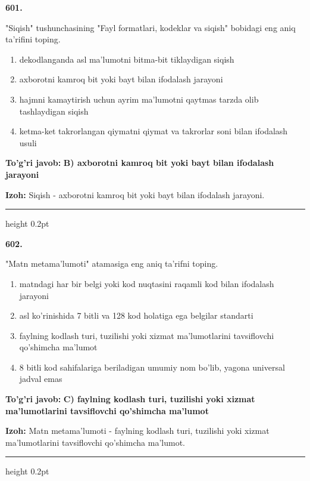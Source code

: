 \documentclass[10pt,a4paper,oneside]{article}
\begin{document}
\noindent\textbf{\color{ink}601.}
\par
"Siqish" tushunchasining "Fayl formatlari, kodeklar va siqish" bobidagi eng aniq ta'rifini toping.
\begin{enumerate}[label=\Alph*),leftmargin=9mm]
\item dekodlanganda asl ma'lumotni bitma-bit tiklaydigan siqish
\item axborotni kamroq bit yoki bayt bilan ifodalash jarayoni
\item hajmni kamaytirish uchun ayrim ma'lumotni qaytmas tarzda olib tashlaydigan siqish
\item ketma-ket takrorlangan qiymatni qiymat va takrorlar soni bilan ifodalash usuli
\end{enumerate}
\begin{tcolorbox}[enhanced,breakable,colback=teal!4,colframe=teal!50!black,boxrule=0.5pt,arc=1.1mm,left=3mm,right=3mm,top=1.7mm,bottom=1.7mm,before skip=2mm,after skip=2mm]
\textbf{\color{teal}To'g'ri javob:} \textbf{B) axborotni kamroq bit yoki bayt bilan ifodalash jarayoni}
\par\smallskip
\textbf{Izoh:} Siqish - axborotni kamroq bit yoki bayt bilan ifodalash jarayoni.
\end{tcolorbox}
\vspace{2mm}\hrule height 0.2pt \vspace{3mm}

\noindent\textbf{\color{ink}602.}
\par
"Matn metama'lumoti" atamasiga eng aniq ta'rifni toping.
\begin{enumerate}[label=\Alph*),leftmargin=9mm]
\item matndagi har bir belgi yoki kod nuqtasini raqamli kod bilan ifodalash jarayoni
\item asl ko'rinishida 7 bitli va 128 kod holatiga ega belgilar standarti
\item faylning kodlash turi, tuzilishi yoki xizmat ma'lumotlarini tavsiflovchi qo'shimcha ma'lumot
\item 8 bitli kod sahifalariga beriladigan umumiy nom bo'lib, yagona universal jadval emas
\end{enumerate}
\begin{tcolorbox}[enhanced,breakable,colback=teal!4,colframe=teal!50!black,boxrule=0.5pt,arc=1.1mm,left=3mm,right=3mm,top=1.7mm,bottom=1.7mm,before skip=2mm,after skip=2mm]
\textbf{\color{teal}To'g'ri javob:} \textbf{C) faylning kodlash turi, tuzilishi yoki xizmat ma'lumotlarini tavsiflovchi qo'shimcha ma'lumot}
\par\smallskip
\textbf{Izoh:} Matn metama'lumoti - faylning kodlash turi, tuzilishi yoki xizmat ma'lumotlarini tavsiflovchi qo'shimcha ma'lumot.
\end{tcolorbox}
\vspace{2mm}\hrule height 0.2pt \vspace{3mm}
\end{document}
